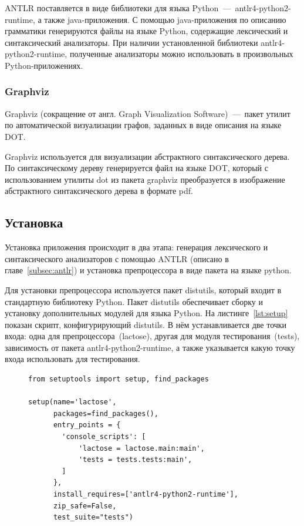 \documentclass[12pt,a4paper,oneside]{extarticle}
\begin{document}
            ANTLR поставляется в виде библиотеки для языка Python~---~antlr4-python2-runtime, а также java-приложения.
            С помощью java-приложения по описанию грамматики генерируются файлы на языке Python, содержащие лексический и синтаксический анализаторы.
            При наличии установленной библиотеки antlr4-python2-runtime, полученные анализаторы можно использовать в произвольных Python-приложениях.            
        \subsubsection{Graphviz}
            Graphviz (сокращение от англ. Graph Visualization Software)~---~пакет утилит по автоматической визуализации графов, заданных в виде описания на языке DOT.

            Graphviz используется для визуализации абстрактного синтаксического дерева.
            По синтаксическому дереву генерируется файл на языке DOT, который с использованием утилиты dot из пакета graphviz преобразуется в изображение абстрактного синтаксического дерева в формате pdf.
    \clearpage

    \subsection{Установка}
        Установка приложения происходит в два этапа: генерация лексического и синтаксического анализаторов с помощью ANTLR (описано в главе~\ref{subsec:antlr}) и установка препроцессора в виде пакета на языке python.
        
        Для установки препроцессора используется пакет distutils, который входит в стандартную библиотеку Python.
        Пакет distutils обеспечивает сборку и установку дополнительных модулей для языка Python.
        На листинге~\ref{lst:setup} показан скрипт, конфигурирующий distutils.
        В нём устанавливается две точки входа: одна для препроцессора~(lactose), другая для модуля тестирования~(tests), зависимость от пакета antlr4-python2-runtime, а также указывается какую точку входа использовать для тестирования.

        \begin{figure}[h!]  
            \begin{lstlisting}[label={lst:setup},caption={Cкрипт конфигурации для утилиты distutils},captionpos=b]
from setuptools import setup, find_packages

setup(name='lactose',
      packages=find_packages(),
      entry_points = {
        'console_scripts': [
            'lactose = lactose.main:main',
            'tests = tests.tests:main',
        ]
      },
      install_requires=['antlr4-python2-runtime'],
      zip_safe=False,
      test_suite="tests")

            \end{lstlisting}
        \end{figure}
\end{document}
